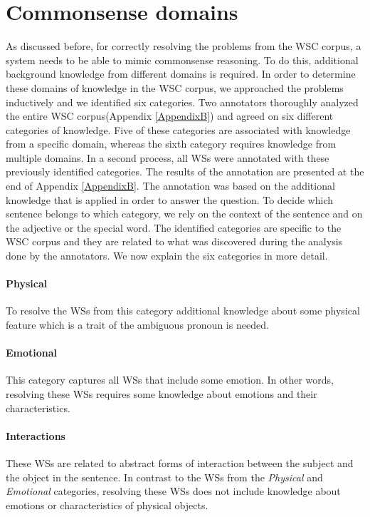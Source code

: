 \section{Commonsense domains}
As discussed before, for correctly resolving the problems from the WSC corpus, a system needs to be able to mimic commonsense reasoning. To do this, additional background knowledge from different domains is required. In order to determine these domains of knowledge in the WSC corpus, we approached the problems inductively and we identified six categories. Two annotators thoroughly analyzed the entire WSC corpus(Appendix \ref{AppendixB}) and agreed on six different categories of knowledge. Five of these categories are associated with knowledge from a specific domain, whereas the sixth category requires knowledge from multiple domains.
In a second process, all WSs were annotated with these previously identified categories. The results of the annotation are presented at the end of Appendix \ref{AppendixB}. The annotation was based on the additional knowledge that is applied in order to answer the question. To decide which sentence belongs to which category, we rely on the context of the sentence and on the adjective or the special word. The identified categories are specific to the WSC corpus and they are related to what was discovered during the analysis done by the annotators. We now explain the six categories in more detail. 

\paragraph{Physical} To resolve the WSs from this category additional knowledge about some physical feature which is a trait of the ambiguous pronoun is needed.
 
\paragraph{Emotional} This category captures all WSs that include some emotion. In other words, resolving these WSs requires some knowledge about emotions and their characteristics.

\paragraph{Interactions} These WSs are related to abstract forms of interaction between the subject and the object in the sentence. In contrast to the WSs from the \textit{Physical} and \textit{Emotional} categories, resolving these WSs does not include knowledge about emotions or characteristics of physical objects.

